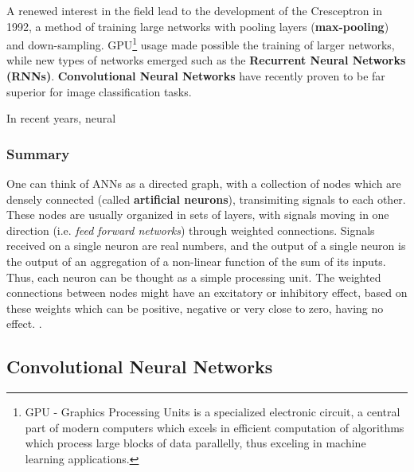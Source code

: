 A renewed interest in the field lead to the development of the
Cresceptron \cite{article:Cresceptron} in 1992, a method of training
large networks with pooling layers (\textbf{max-pooling}) and down-sampling.
GPU\footnote{GPU - Graphics Processing Units is a specialized
electronic circuit, a central part of modern computers which excels in
efficient computation of algorithms which process large blocks of data
parallelly, thus exceling in machine learning applications.} usage made
possible the training of larger networks, while new types of networks
emerged such as the \textbf{Recurrent Neural Networks (RNNs)}.
\textbf{Convolutional Neural Networks} have recently proven to be
far superior for image classification tasks.

In recent years, neural 


\subsubsection{Summary}

One can think of ANNs as a directed graph, with a collection of nodes
which are densely connected (called \textbf{artificial neurons}),
transimiting signals to each other. These nodes are usually
organized in sets of layers, with signals moving in one direction
(i.e. \textit{feed forward networks}) through weighted connections.
Signals received on a single neuron are real numbers, and the output
of a single neuron is the output of an aggregation of a non-linear function
of the sum of its inputs. Thus, each neuron can be thought as a simple
processing unit.  The weighted connections between nodes might have an
excitatory or inhibitory effect, based on these weights which can be
positive, negative or very close to zero, having no effect.
\cite[Chap. ~ 1]{book:Gurney1997AnIT}.


\newpage
\subsection{Convolutional Neural Networks}